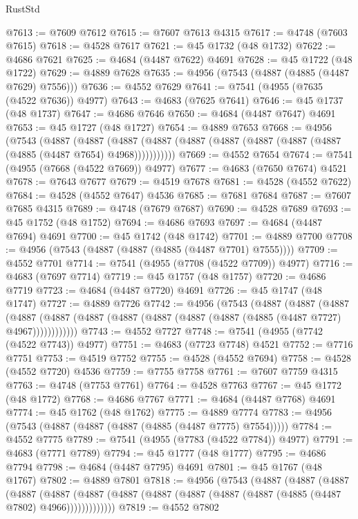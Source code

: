 \begin{lexlean}{RustStd}
\begin{coremodule}
@7613 := @7609 @7612
@7615 := @7607 @7613 @4315
@7617 := @4748 (@7603 @7615)
@7618 := @4528 @7617
@7621 := @45 @1732 (@48 @1732)
@7622 := @4686 @7621
@7625 := @4684 (@4487 @7622) @4691
@7628 := @45 @1722 (@48 @1722)
@7629 := @4889 @7628
@7635 := @4956 (@7543 (@4887 (@4885 (@4487 @7629) @7556)))
@7636 := @4552 @7629
@7641 := @7541 (@4955 (@7635 (@4522 @7636)) @4977)
@7643 := @4683 (@7625 @7641)
@7646 := @45 @1737 (@48 @1737)
@7647 := @4686 @7646
@7650 := @4684 (@4487 @7647) @4691
@7653 := @45 @1727 (@48 @1727)
@7654 := @4889 @7653
@7668 := @4956
    (@7543
      (@4887
        (@4887
          (@4887 (@4887 (@4887 (@4887 (@4887 (@4887 (@4887 (@4885 (@4487 @7654) @4968)))))))))))
@7669 := @4552 @7654
@7674 := @7541 (@4955 (@7668 (@4522 @7669)) @4977)
@7677 := @4683 (@7650 @7674) @4521
@7678 := @7643 @7677
@7679 := @4519 @7678
@7681 := @4528 (@4552 @7622)
@7684 := @4528 (@4552 @7647) @4536
@7685 := @7681 @7684
@7687 := @7607 @7685 @4315
@7689 := @4748 (@7679 @7687)
@7690 := @4528 @7689
@7693 := @45 @1752 (@48 @1752)
@7694 := @4686 @7693
@7697 := @4684 (@4487 @7694) @4691
@7700 := @45 @1742 (@48 @1742)
@7701 := @4889 @7700
@7708 := @4956 (@7543 (@4887 (@4887 (@4885 (@4487 @7701) @7555))))
@7709 := @4552 @7701
@7714 := @7541 (@4955 (@7708 (@4522 @7709)) @4977)
@7716 := @4683 (@7697 @7714)
@7719 := @45 @1757 (@48 @1757)
@7720 := @4686 @7719
@7723 := @4684 (@4487 @7720) @4691
@7726 := @45 @1747 (@48 @1747)
@7727 := @4889 @7726
@7742 := @4956
    (@7543
      (@4887
        (@4887
          (@4887
            (@4887 (@4887 (@4887 (@4887 (@4887 (@4887 (@4887 (@4885 (@4487 @7727) @4967))))))))))))
@7743 := @4552 @7727
@7748 := @7541 (@4955 (@7742 (@4522 @7743)) @4977)
@7751 := @4683 (@7723 @7748) @4521
@7752 := @7716 @7751
@7753 := @4519 @7752
@7755 := @4528 (@4552 @7694)
@7758 := @4528 (@4552 @7720) @4536
@7759 := @7755 @7758
@7761 := @7607 @7759 @4315
@7763 := @4748 (@7753 @7761)
@7764 := @4528 @7763
@7767 := @45 @1772 (@48 @1772)
@7768 := @4686 @7767
@7771 := @4684 (@4487 @7768) @4691
@7774 := @45 @1762 (@48 @1762)
@7775 := @4889 @7774
@7783 := @4956 (@7543 (@4887 (@4887 (@4887 (@4885 (@4487 @7775) @7554)))))
@7784 := @4552 @7775
@7789 := @7541 (@4955 (@7783 (@4522 @7784)) @4977)
@7791 := @4683 (@7771 @7789)
@7794 := @45 @1777 (@48 @1777)
@7795 := @4686 @7794
@7798 := @4684 (@4487 @7795) @4691
@7801 := @45 @1767 (@48 @1767)
@7802 := @4889 @7801
@7818 := @4956
    (@7543
      (@4887
        (@4887
          (@4887
            (@4887
              (@4887
                (@4887 (@4887 (@4887 (@4887 (@4887 (@4887 (@4885 (@4487 @7802) @4966)))))))))))))
@7819 := @4552 @7802

\end{coremodule}
\end{lexlean}
